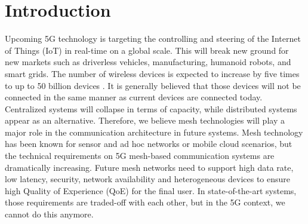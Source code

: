 \documentclass[electronics,article,accept,moreauthors,pdftex,10pt,a4paper]{mdpi}
\theoremstyle{mdpi}
\newcounter{ex}
\newcounter{re}
\theoremstyle{mdpidefinition}
\begin{document}
\newcommand*\Reactivatenumber{%
  \lst@AddToHook{OnNewLine}{%
   \let\thelstnumber\origthelstnumber%
   \advance\c@lstnumber\@ne\relax}%
}






\section{Introduction}
%

%

Upcoming 5G technology is targeting the controlling and steering of the Internet of Things (IoT) in real-time on a global scale. This will break new ground for new markets such as driverless vehicles, manufacturing, humanoid robots, and smart grids. The number of wireless devices is expected to increase by five times to up to 50 billion devices \cite{cisco2011forecast}. It is generally believed that those devices will not be connected in the same manner as current devices are connected today. Centralized systems will collapse in terms of capacity, while distributed systems appear as an alternative. Therefore, we believe mesh technologies will play a major role in the communication architecture in future systems. Mesh technology has been known for sensor and ad hoc networks or mobile cloud scenarios, but the technical requirements on 5G mesh-based communication systems are dramatically increasing. Future mesh networks need to support high data rate, low latency, security, network availability and heterogeneous devices to ensure high Quality of Experience (QoE) for the final user. In state-of-the-art systems, those requirements are traded-off with each other, but in the 5G context, we cannot do this anymore.
\end{document}
